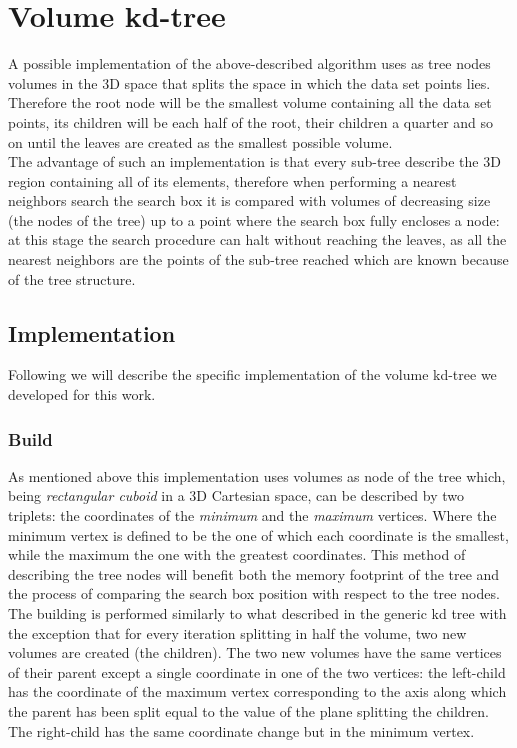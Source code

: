\section{Volume kd-tree}
A possible implementation of the above-described algorithm uses as tree nodes volumes in the 3D space that splits the space in which the data set points lies. Therefore the root node will be the smallest volume containing all the data set points, its children will be each half of the root, their children a quarter and so on until the leaves are created as the smallest possible volume.\\
The advantage of such an implementation is that every sub-tree describe the 3D region containing all of its elements, therefore when performing a nearest neighbors search the search box it is compared with volumes of decreasing size (the nodes of the tree) up to a point where the search box fully encloses a node: at this stage the search procedure can halt without reaching the leaves, as all the nearest neighbors are the points of the sub-tree reached which are known because of the tree structure.\\

\subsection{Implementation}
Following we will describe the specific implementation of the volume kd-tree we developed for this work.
\subsubsection{Build}
As mentioned above this implementation uses volumes as node of the tree which, being \textit{rectangular cuboid} in a 3D Cartesian space, can be described by two triplets: the coordinates of the \textit{minimum} and the \textit{maximum} vertices. Where the minimum vertex is defined to be the one of which each coordinate is the smallest, while the maximum the one with the greatest coordinates. This method of describing the tree nodes will benefit both the memory footprint of the tree and the process of comparing the search box position with respect to the tree nodes.\\
The building is performed similarly to what described in the generic kd tree with the exception that for every iteration splitting in half the volume, two new volumes are created (the children). The two new volumes have the same vertices of their parent except a single coordinate in one of the two vertices: the left-child has the coordinate of the maximum vertex corresponding to the axis along which the parent has been split equal to the value of the plane splitting the children. The right-child has the same coordinate change but in the minimum vertex.\\
